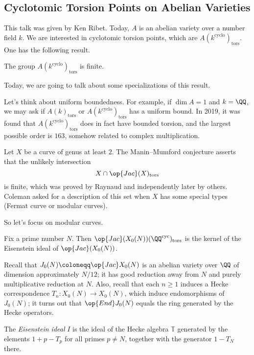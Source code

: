 \documentclass{article}
\begin{document}
\subsection{Cyclotomic Torsion Points on Abelian Varieties}
This talk was given by Ken Ribet. Today, $A$ is an abelian variety over a number field $k$. We are interested in cyclotomic torsion points, which are $A(k^{\mathrm{cyclo}})_{\mathrm{tors}}$. One has the following result.
\begin{theorem}[Ribet]
	The group $A(k^{\mathrm{cyclo}})_{\mathrm{tors}}$ is finite.
\end{theorem}
Today, we are going to talk about some specializations of this result.
\begin{remark}
	Let's think about uniform boundedness. For example, if $\dim A=1$ and $k=\QQ$, we may ask if $A(k)_{\mathrm{tors}}$ or $A(k^{\mathrm{cyclo}})_{\mathrm{tors}}$ has a uniform bound. In 2019, it was found that $A(k^{\mathrm{cyclo}})_{\mathrm{tors}}$ does in fact have bounded torsion, and the largest possible order is $163$, somehow related to complex multiplication.
\end{remark}
\begin{remark}
	Let $X$ be a curve of genus at least $2$. The Manin--Mumford conjecture asserts that the unlikely intersection
	\[X\cap\op{Jac}(X)_{\mathrm{tors}}\]
	is finite, which was proved by Raynaud and independently later by others. Coleman asked for a description of this set when $X$ has some special types (Fermat curve or modular curves).
\end{remark}
So let's focus on modular curves.
\begin{theorem} \label{thm:cyclo-by-eisen}
	Fix a prime number $N$. Then $\op{Jac}(X_0(N))(\QQ^{\mathrm{cyc}})_{\mathrm{tors}}$ is the kernel of the Eisenstein ideal of $\op{Jac}(X_0(N))$.
\end{theorem}
Recall that $J_0(N)\coloneqq\op{Jac}X_0(N)$ is an abelian variety over $\QQ$ of dimension approximately $N/12$; it has good reduction away from $N$ and purely multiplicative reduction at $N$. Also, recall that each $n\ge1$ induces a Hecke correspondence $T_n\colon X_0(N)\to X_0(N)$, which induce endomorphisms of $J_0(N)$; it turns out that $\op{End}J_0(N)$ equals the ring generated by the Hecke operators.
\begin{definition}
	The \textit{Eisenstein ideal} $I$ is the ideal of the Hecke algebra $\mathbb T$ generated by the elements $1+p-T_p$ for all primes $p\ne N$, together with the generator $1-T_N$ there.
\end{definition}
\end{document}
